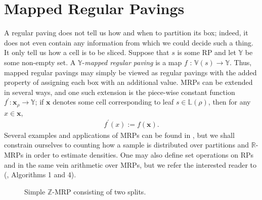 \documentclass{report}
\begin{document}
\section{Mapped Regular Pavings}
A regular paving does not tell us how and when to partition its box; indeed, it does not even contain any information from which we could decide such a thing. It only tell us how a cell is to be sliced.
Suppose that $s$ is some RP and let $\mathbb{Y}$ be some non-empty set. A $\mathbb{Y}$-\textit{mapped regular paving} is a map $f$ : $\mathbb{V}(s) \rightarrow \mathbb{Y}$.
Thus, mapped regular pavings may simply be viewed as regular pavings with the added property of assigning each box with an additional value. MRPs can be extended in several ways, and one such extension is 
the piece-wise constant function $f^\prime : \mathbf{x}_{\rho} \rightarrow \mathbb{Y}$; if $\mathbf{x}$ denotes some cell corresponding to leaf $s \in \mathbb{L}(\rho)$, then for any $x \in \mathbf{x}$, 
\begin{align*}
	f^\prime(x) := f(\mathbf{x}).
\end{align*}
Several examples and applications of MRPs can be found in \cite{Mapped Regular Pavings}, but we shall constrain ourselves to counting how a sample is distributed over partitions and $\mathbb{R}$-MRPs in order to estimate densities.
One may also define set operations on RPs and in the same vein arithmetic over MRPs, but we refer the interested reader to (\cite{Mapped Regular Pavings}, Algorithms 1 and 4). 
\begin{figure}[H]
  \begin{center}
  \end{center}
  \caption{Simple $\mathbb{Z}$-MRP consisting of two splits.}
\end{figure}
\end{document}
